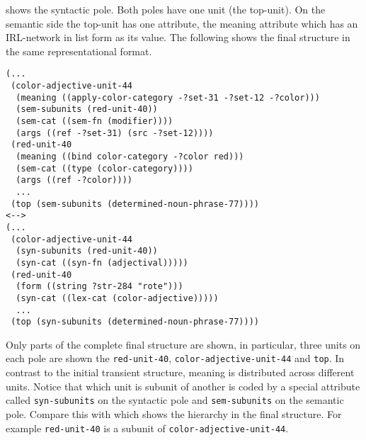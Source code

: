 shows the syntactic pole. Both poles have one unit (the top-unit). 
On the semantic side the top-unit has one attribute, the meaning attribute
which has an IRL-network in list form as its value. 
The following shows the final structure in the same representational 
format.
\begin{lstlisting}
(...
 (color-adjective-unit-44
  (meaning ((apply-color-category -?set-31 -?set-12 -?color)))
  (sem-subunits (red-unit-40))
  (sem-cat ((sem-fn (modifier))))
  (args ((ref -?set-31) (src -?set-12))))
 (red-unit-40
  (meaning ((bind color-category -?color red)))
  (sem-cat ((type (color-category))))
  (args ((ref -?color))))
  ...
 (top (sem-subunits (determined-noun-phrase-77))))
<-->
(...
 (color-adjective-unit-44
  (syn-subunits (red-unit-40))
  (syn-cat ((syn-fn (adjectival)))))
 (red-unit-40
  (form ((string ?str-284 "rote")))
  (syn-cat ((lex-cat (color-adjective)))))
  ...
 (top (syn-subunits (determined-noun-phrase-77))))
\end{lstlisting}
Only parts of the complete final structure are shown,
in particular, three units on each pole are shown the 
{\footnotesize\tt red-unit-40}, {\footnotesize\tt color-adjective-unit-44}
and {\footnotesize\tt top}. In contrast to the initial transient structure,
meaning is distributed across different units.
Notice that which unit is subunit of another is coded by a special
attribute called {\footnotesize\tt syn-subunits} on the syntactic pole
and {\footnotesize\tt sem-subunits} on the semantic pole. Compare
this with  which shows the hierarchy in the final\enlargethispage{1\baselineskip}
structure. For example {\footnotesize\tt red-unit-40} is a subunit of 
{\footnotesize\tt color-adjective-unit-44}.

